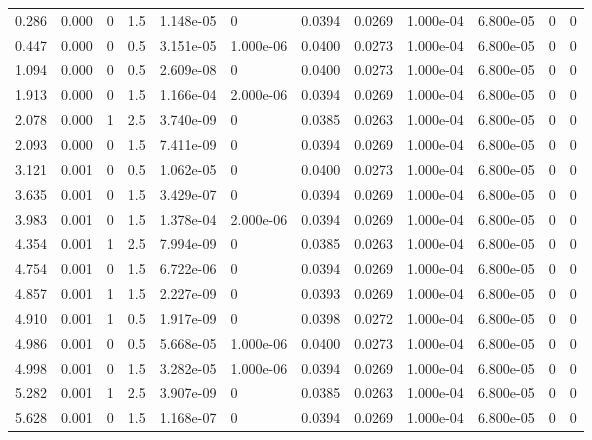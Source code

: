 \documentclass[preview]{standalone}
\begin{document}
{{\begin{tabular}{L{1.2cm}C{1.2cm} C{0.3cm}C{0.5cm} C{1.4cm}C{1.4cm} C{1.4cm}C{1.4cm} C{1.6cm}C{1.6cm} C{1.6cm}C{1.6cm}}
  0.286  &  0.000  & 0     & 1.5 &  1.148e-05  & 0  &  0.0394&   0.0269& 1.000e-04 & 6.800e-05   &  0 & 0  \\ 
  0.447  &  0.000  & 0     & 0.5 &  3.151e-05  & 1.000e-06  &  0.0400&   0.0273& 1.000e-04 & 6.800e-05   &  0 & 0  \\ 
  1.094  &  0.000  & 0     & 0.5 &  2.609e-08  & 0  &  0.0400&   0.0273& 1.000e-04 & 6.800e-05   &  0 & 0  \\ 
  1.913  &  0.000  & 0     & 1.5 &  1.166e-04  & 2.000e-06  &  0.0394&   0.0269& 1.000e-04 & 6.800e-05   &  0 & 0  \\ 
  2.078  &  0.000  & 1     & 2.5 &  3.740e-09  & 0  &  0.0385&   0.0263& 1.000e-04 & 6.800e-05   &  0 & 0  \\ 
  2.093  &  0.000  & 0     & 1.5 &  7.411e-09  & 0  &  0.0394&   0.0269& 1.000e-04 & 6.800e-05   &  0 & 0  \\ 
  3.121  &  0.001  & 0     & 0.5 &  1.062e-05  & 0  &  0.0400&   0.0273& 1.000e-04 & 6.800e-05   &  0 & 0  \\ 
  3.635  &  0.001  & 0     & 1.5 &  3.429e-07  & 0  &  0.0394&   0.0269& 1.000e-04 & 6.800e-05   &  0 & 0  \\ 
  3.983  &  0.001  & 0     & 1.5 &  1.378e-04  & 2.000e-06  &  0.0394&   0.0269& 1.000e-04 & 6.800e-05   &  0 & 0  \\ 
  4.354  &  0.001  & 1     & 2.5 &  7.994e-09  & 0  &  0.0385&   0.0263& 1.000e-04 & 6.800e-05   &  0 & 0  \\ 
  4.754  &  0.001  & 0     & 1.5 &  6.722e-06  & 0  &  0.0394&   0.0269& 1.000e-04 & 6.800e-05   &  0 & 0  \\ 
  4.857  &  0.001  & 1     & 1.5 &  2.227e-09  & 0  &  0.0393&   0.0269& 1.000e-04 & 6.800e-05   &  0 & 0  \\ 
  4.910  &  0.001  & 1     & 0.5 &  1.917e-09  & 0  &  0.0398&   0.0272& 1.000e-04 & 6.800e-05   &  0 & 0  \\ 
  4.986  &  0.001  & 0     & 0.5 &  5.668e-05  & 1.000e-06  &  0.0400&   0.0273& 1.000e-04 & 6.800e-05   &  0 & 0  \\ 
  4.998  &  0.001  & 0     & 1.5 &  3.282e-05  & 1.000e-06  &  0.0394&   0.0269& 1.000e-04 & 6.800e-05   &  0 & 0  \\ 
  5.282  &  0.001  & 1     & 2.5 &  3.907e-09  & 0  &  0.0385&   0.0263& 1.000e-04 & 6.800e-05   &  0 & 0  \\ 
  5.628  &  0.001  & 0     & 1.5 &  1.168e-07  & 0  &  0.0394&   0.0269& 1.000e-04 & 6.800e-05   &  0 & 0  \\ 

\end{tabular}}}
\end{document}
